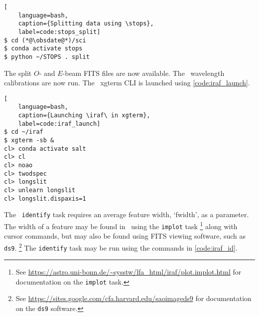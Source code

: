 \begin{lstlisting}[
    language=bash,
    caption={Splitting data using \stops},
    label=code:stops_split]
$ cd (*@\obsdate@*)/sci
$ conda activate stops
$ python ~/STOPS . split
\end{lstlisting}

The split $O$- and $E$-beam \gls{FITS} files are now available. The \iraf\ wavelength calibrations are now run. The \iraf\ xgterm \gls{CLI} is launched using \autoref{code:iraf_launch}.

\begin{lstlisting}[
    language=bash,
    caption={Launching \iraf\ in xgterm},
    label=code:iraf_launch]
$ cd ~/iraf
$ xgterm -sb &
cl> conda activate salt
cl> cl
cl> noao
cl> twodspec
cl> longslit
cl> unlearn longslit
cl> longslit.dispaxis=1
\end{lstlisting}

The \iraf\ \texttt{identify} task requires an average feature width, `fwidth', as a parameter. The width of a feature may be found in \iraf\ using the \texttt{implot} task%
\footnote{See \protect\url{https://astro.uni-bonn.de/~sysstw/lfa_html/iraf/plot.implot.html} for documentation on the \texttt{implot} task.}
along with cursor commands, but may also be found using \gls{FITS} viewing software, such as \texttt{ds9}.%
\footnote{See \protect\url{https://sites.google.com/cfa.harvard.edu/saoimageds9} for documentation on the \texttt{ds9} software.}
The \texttt{identify} task may be run using the commands in \autoref{code:iraf_id}.

